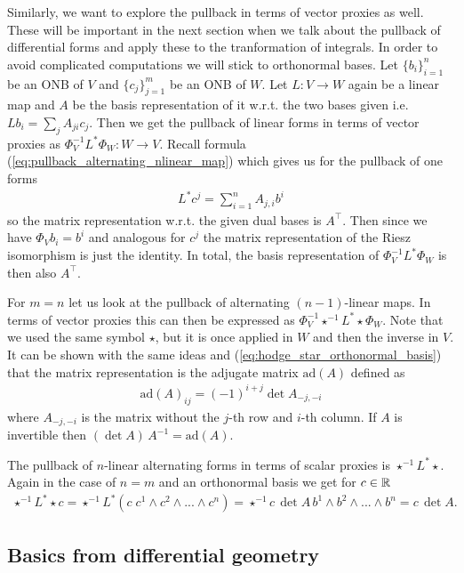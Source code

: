 \documentclass[../master_thesis.tex]{subfiles}
\begin{document}
Similarly, we want to explore the pullback in terms of vector proxies as well. 
These will be important in the next section when we talk about the pullback 
of differential forms and apply these to the tranformation of integrals.
In order to avoid complicated computations we will stick to orthonormal bases.
Let $\{ b_i \}_{i=1}^n$ be an ONB of $V$ and 
$\{ c_j \}_{j=1}^m$ be an ONB of $W$. Let $L : V \rightarrow W$ 
again be a linear map and $A$ be the basis representation of it w.r.t. 
the two bases given i.e. $L b_i = \sum_j A_{ji} c_j$. 
Then we get the pullback of linear forms in terms 
of vector proxies 
as $\Phi_V^{-1} L^* \Phi_W : W \rightarrow V$. Recall 
formula (\ref{eq:pullback_alternating_nlinear_map}) which 
gives us for the pullback of one forms 
\begin{align}
    L^* c^j = \sum_{i=1}^n A_{j,i} b^i \label{eq:pullback_linear_forms}
\end{align}
so the matrix representation w.r.t. the given dual bases is $A^\top$.
Then since we have $\Phi_V b_i = b^i$ and analogous for $c^j$
the matrix representation of the Riesz isomorphism is just the identity.
In total, the basis representation of $\Phi_V^{-1} L^* \Phi_W$ is then also 
$A^\top$.

For $m=n$ let us look at the pullback of alternating $(n-1)$-linear maps.
In terms of vector proxies this can then be expressed as 
$\Phi_V^{-1} \star^{-1} L^* \star \Phi_W$. Note that we used the same symbol 
$\star$, but it is once applied in $W$ and then the inverse in $V$. It 
can be shown with the same ideas and (\ref{eq:hodge_star_orthonormal_basis})
that the matrix representation is the adjugate matrix 
$\text{ad}(A)$ defined as 
\begin{align*}
    \text{ad}(A)_{ij} = (-1)^{i+j} \det A_{-j,-i}
\end{align*} 
where $A_{-j,-i}$ is the matrix without the $j$-th row and $i$-th column.
If $A$ is invertible then $(\det A)\,A^{-1} =  \text{ad}(A)$. 

The pullback of $n$-linear alternating forms in terms of scalar proxies is 
$\star^{-1} L^* \star$. Again in the case of $n=m$ and an 
orthonormal basis we get for $c \in \mathbb{R}$
\begin{align*}
    \star^{-1} L^* \star c = \star^{-1} L^* (c \; c^1 \wedge c^2 \wedge ... \wedge c^n)
    = \star^{-1} c\,\det A \,b^1 \wedge b^2 \wedge ... \wedge b^n = c\,\det A.
\end{align*}

\subsection{Basics from differential geometry}\label{sec:differential_geometry}
\end{document}
